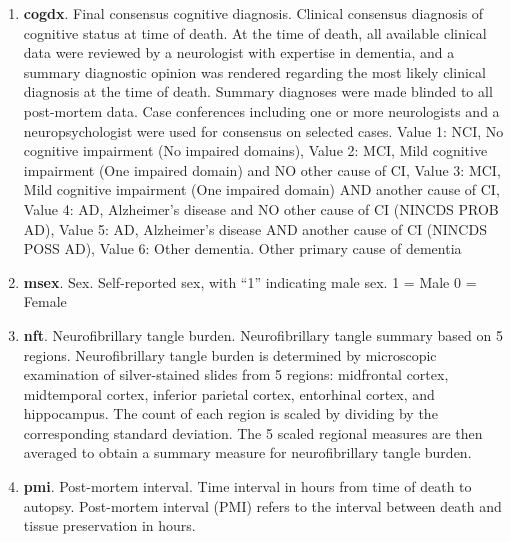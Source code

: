 \begin{enumerate}
    \item \textbf{cogdx}. Final consensus cognitive diagnosis. Clinical consensus diagnosis of cognitive status at time of death. At the time of death, all available clinical data were reviewed by a neurologist with expertise in dementia, and a summary diagnostic opinion was rendered regarding the most likely clinical diagnosis at the time of death. Summary diagnoses were made blinded to all post-mortem data. Case conferences including one or more neurologists and a neuropsychologist were used for consensus on selected cases. Value 1: NCI, No cognitive impairment (No impaired domains), Value 2: MCI, Mild cognitive impairment (One impaired domain) and NO other cause of CI, Value 3: MCI, Mild cognitive impairment (One impaired domain) AND another cause of CI, Value 4: AD, Alzheimer’s disease and NO other cause of CI (NINCDS PROB AD), Value 5: AD, Alzheimer’s disease AND another cause of CI (NINCDS POSS AD), Value 6: Other dementia. Other primary cause of dementia
    \item \textbf{msex}. Sex. Self-reported sex, with “1” indicating male sex. 1 = Male 0 = Female
    \item \textbf{nft}. Neurofibrillary tangle burden. Neurofibrillary tangle summary based on 5 regions. Neurofibrillary tangle burden is determined by microscopic examination of silver-stained slides from 5 regions: midfrontal cortex, midtemporal cortex, inferior parietal cortex, entorhinal cortex, and hippocampus. The count of each region is scaled by dividing by the corresponding standard deviation. The 5 scaled regional measures are then averaged to obtain a summary measure for neurofibrillary tangle burden.
    \item \textbf{pmi}. Post-mortem interval. Time interval in hours from time of death to autopsy. Post-mortem interval (PMI) refers to the interval between death and tissue preservation in hours.
\end{enumerate}
